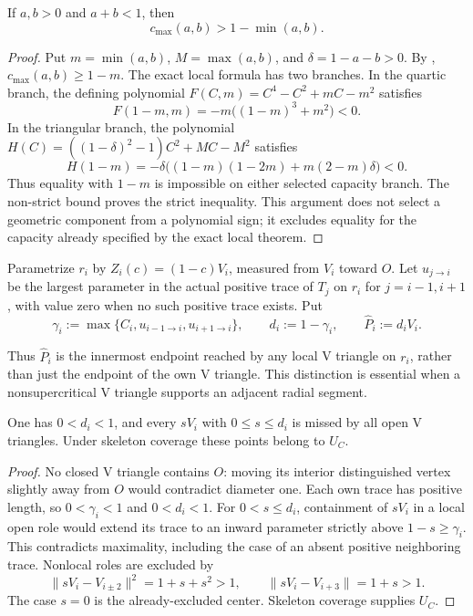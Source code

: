 \begin{lemma}
\label{lem:strict-own-ray-positive-slack}
If $a,b>0$ and $a+b<1$, then
\[
 c_{\max}(a,b)>1-\min(a,b).
\]
\end{lemma}
\begin{proof}
Put $m=\min(a,b)$, $M=\max(a,b)$, and $\delta=1-a-b>0$.
By , $c_{\max}(a,b)\ge1-m$.
The exact local formula  has two branches. In the quartic branch, the defining polynomial
$F(C,m)=C^4-C^2+mC-m^2$ satisfies
\[
 F(1-m,m)=-m\bigl((1-m)^3+m^2\bigr)<0.
\]
In the triangular branch, the polynomial
$H(C)=((1-\delta)^2-1)C^2+MC-M^2$ satisfies
\[
 H(1-m)=-\delta\bigl((1-m)(1-2m)+m(2-m)\delta\bigr)<0.
\]
Thus equality with $1-m$ is impossible on either selected capacity branch.
The non-strict bound proves the strict inequality. This argument does not
select a geometric component from a polynomial sign; it excludes equality
for the capacity already specified by the exact local theorem.
\end{proof}

\begin{definition}
\label{def:fixed-total-radial-endpoint}
Parametrize $r_i$ by $Z_i(c)=(1-c)V_i$, measured from $V_i$ toward $O$.
Let $u_{j\to i}$ be the largest parameter in the actual positive trace of
$T_j$ on $r_i$ for $j=i-1,i+1$, with value zero when no such positive trace
exists. Put
\[
 \gamma_i:=\max\{C_i,u_{i-1\to i},u_{i+1\to i}\},\qquad
 d_i:=1-\gamma_i,\qquad \widehat P_i:=d_iV_i.
\]
\end{definition}

Thus $\widehat P_i$ is the innermost endpoint reached by any local V
triangle on $r_i$, rather than just the endpoint of the own V triangle.
This distinction is essential when a nonsupercritical V triangle supports
an adjacent radial segment.

\begin{lemma}
\label{lem:fixed-total-radial-forcing}
\label{lem:appendix-fixed-total-endpoint}
One has $0<d_i<1$, and every $sV_i$ with $0\le s\le d_i$ is missed
by all open V triangles. Under skeleton coverage these points belong to $U_C$.
\end{lemma}
\begin{proof}
No closed V triangle contains $O$: moving its interior distinguished vertex
slightly away from $O$ would contradict diameter one. Each own trace has
positive length, so $0<\gamma_i<1$ and $0<d_i<1$.
For $0<s\le d_i$, containment of $sV_i$ in a local open role would extend
its trace to an inward parameter strictly above $1-s\ge\gamma_i$.
This contradicts maximality, including the case of an absent positive
neighboring trace. Nonlocal roles are excluded by
\[
 \|sV_i-V_{i\pm2}\|^2=1+s+s^2>1,
 \qquad \|sV_i-V_{i+3}\|=1+s>1.
\]
The case $s=0$ is the already-excluded center. Skeleton coverage supplies $U_C$.
\end{proof}

